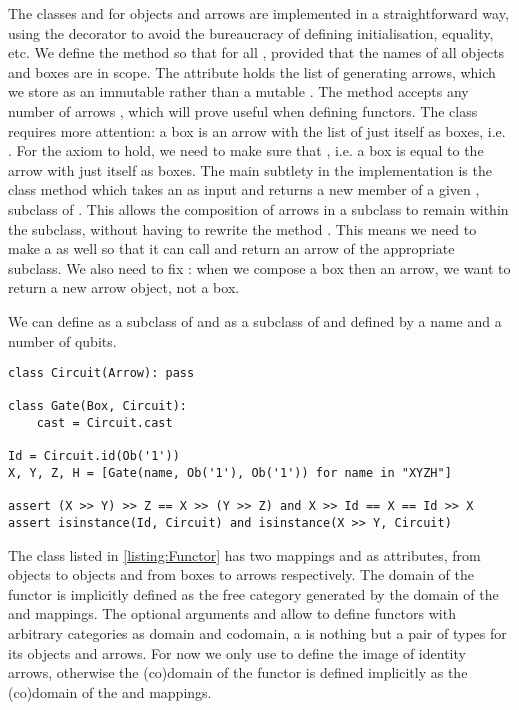 The classes  and  for objects and arrows are implemented in a straightforward way, using the  decorator to avoid the bureaucracy of defining initialisation, equality, etc.
We define the method  so that  for all , provided that the names of all objects and boxes are in scope.
The attribute  holds the list of generating arrows, which we store as an immutable  rather than a mutable .
The method  accepts any number of arrows , which will prove useful when defining functors.
The  class requires more attention: a box  is an arrow with the list of just itself as boxes, i.e. .
For the axiom    to hold, we need to make sure that , i.e. a box is equal to the arrow with just itself as boxes.
The main subtlety in the implementation is the class method  which takes an  as input and returns a new member of a given , subclass of .
This allows the composition of arrows in a subclass to remain within the subclass, without having to rewrite the method .
This means we need to make  a  as well so that it can call  and return an arrow of the appropriate subclass.
We also need to fix : when we compose a box then an arrow, we want to return a new arrow object, not a box.

\begin{example}\label{example:Circuit}
We can define  as a subclass of  and  as a subclass of  and  defined by a name and a number of qubits.

\begin{verbatim}
class Circuit(Arrow): pass

class Gate(Box, Circuit):
    cast = Circuit.cast

Id = Circuit.id(Ob('1'))
X, Y, Z, H = [Gate(name, Ob('1'), Ob('1')) for name in "XYZH"]

assert (X >> Y) >> Z == X >> (Y >> Z) and X >> Id == X == Id >> X
assert isinstance(Id, Circuit) and isinstance(X >> Y, Circuit)
\end{verbatim}
\end{example}

The  class listed in \ref{listing:Functor} has two mappings  and  as attributes, from objects to objects and from boxes to arrows respectively.
The domain of the functor is implicitly defined as the free category generated by the domain of the  and  mappings.
The optional arguments  and  allow to define functors with arbitrary categories as domain and codomain, a  is nothing but a pair of types for its objects and arrows.
For now we only use  to define the image of identity arrows, otherwise the (co)domain of the functor is defined implicitly as the (co)domain of the  and  mappings.

